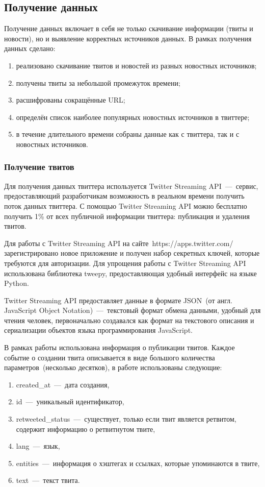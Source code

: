 \subsection{Получение данных}
    Получение данных включает в себя не только скачивание информации (твиты и новости), но и выявление корректных источников данных.
    В рамках получения данных сделано:
    \begin{enumerate}
        \item реализовано скачивание твитов и новостей из разных новостных источников;
        \item получены твиты за небольшой промежуток времени;
        \item расшифрованы сокращённые URL;
        \item определён список наиболее популярных новостных источников в твиттере;
        \item в течение длительного времени собраны данные как с твиттера, так и с новостных источников.
    \end{enumerate}

    \subsubsection{Получение твитов}
        Для получения данных твиттера используется Twitter Streaming API~---~сервис,
        предоставляющий разработчикам возможность в реальном времени получить поток данных твиттера.
        С помощью Twitter Streaming API можно бесплатно получить 1\% от всех публичной информации твиттера: публикация и удаления твитов.

        Для работы с Twitter Streaming API на сайте~https://apps.twitter.com/ зарегистрировано новое приложение и получен набор секретных ключей,
        которые требуются для авторизации.
        Для упрощения работы с Twitter Streaming API использована библиотека tweepy, предоставляющая удобный интерфейс на языке Python.

        Twitter Streaming API предоставляет данные в формате JSON~(от англ. JavaScript Object Notation)~---~текстовый формат обмена данными, удобный для чтения человек,
        первоначально создавался как формат на текстового описания и сериализации объектов языка программирования JavaScript.

        В рамках работы использована информация о публикации твитов.
        Каждое событие о создании твита описывается в виде большого количества параметров~(несколько десятков), в работе использованы следующие:
        \begin{enumerate}
            \item created\_at~---~дата создания,
            \item id~---~уникальный идентификатор,
            \item retweeted\_status~---~существует, только если твит является ретвитом, содержит информацию о ретвитнутом твите,
            \item lang~---~язык,
            \item entities~---~информация о хэштегах и ссылках, которые упоминаются  в твите,
            \item text~---~текст твита.
        \end{enumerate}


